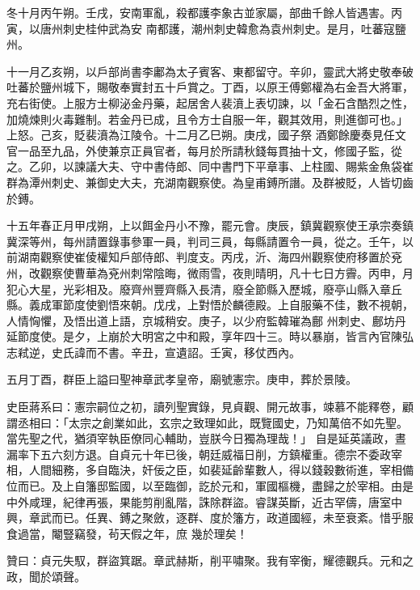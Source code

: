 \begin{pinyinscope}
 冬十月丙午朔。壬戌，安南軍亂，殺都護李象古並家屬，部曲千餘人皆遇害。丙寅，以唐州刺史桂仲武為安
 南都護，潮州刺史韓愈為袁州刺史。是月，吐蕃寇鹽州。



 十一月乙亥朔，以戶部尚書李鄘為太子賓客、東都留守。辛卯，靈武大將史敬奉破吐蕃於鹽州城下，賜敬奉實封五十戶賞之。丁酉，以原王傅鄭權為右金吾大將軍，充右街使。上服方士柳泌金丹藥，起居舍人裴濆上表切諫，以「金石含酷烈之性，加燒煉則火毒難制。若金丹已成，且令方士自服一年，觀其效用，則進御可也。」上怒。己亥，貶裴濆為江陵令。十二月乙巳朔。庚戌，國子祭
 酒鄭餘慶奏見任文官一品至九品，外使兼京正員官者，每月於所請秋錢每貫抽十文，修國子監，從之。乙卯，以諫議大夫、守中書侍郎、同中書門下平章事、上柱國、賜紫金魚袋崔群為潭州刺史、兼御史大夫，充湖南觀察使。為皇甫鎛所譖。及群被貶，人皆切齒於鎛。



 十五年春正月甲戌朔，上以餌金丹小不豫，罷元會。庚辰，鎮冀觀察使王承宗奏鎮冀深等州，每州請置錄事參軍一員，判司三員，每縣請置令一員，從之。壬午，以
 前湖南觀察使崔倰權知戶部侍郎、判度支。丙戌，沂、海四州觀察使府移置於兗州，改觀察使曹華為兗州刺常陰晦，微雨雪，夜則晴明，凡十七日方霽。丙申，月犯心大星，光彩相及。廢齊州豐齊縣入長清，廢全節縣入歷城，廢亭山縣入章丘縣。義成軍節度使劉悟來朝。戊戌，上對悟於麟德殿。上自服藥不佳，數不視朝，人情恟懼，及悟出道上語，京城稍安。庚子，以少府監韓璀為鄜
 州刺史、鄜坊丹延節度使。是夕，上崩於大明宮之中和殿，享年四十三。時以暴崩，皆言內官陳弘志弒逆，史氏諱而不書。辛丑，宣遺詔。壬寅，移仗西內。



 五月丁酉，群臣上謚曰聖神章武孝皇帝，廟號憲宗。庚申，葬於景陵。



 史臣蔣系曰：憲宗嗣位之初，讀列聖實錄，見貞觀、開元故事，竦慕不能釋卷，顧謂丞相曰：「太宗之創業如此，玄宗之致理如此，既覽國史，乃知萬倍不如先聖。當先聖之代，猶須宰執臣僚同心輔助，豈朕今日獨為理哉！」
 自是延英議政，晝漏率下五六刻方退。自貞元十年已後，朝廷威福日削，方鎮權重。德宗不委政宰相，人間細務，多自臨決，奸佞之臣，如裴延齡輩數人，得以錢穀數術進，宰相備位而已。及上自籓邸監國，以至臨御，訖於元和，軍國樞機，盡歸之於宰相。由是中外咸理，紀律再張，果能剪削亂階，誅除群盜。睿謀英斷，近古罕儔，唐室中興，章武而已。任異、鎛之聚斂，逐群、度於籓方，政道國經，未至衰紊。惜乎服食過當，閹豎竊發，茍天假之年，庶
 幾於理矣！



 贊曰：貞元失馭，群盜箕踞。章武赫斯，削平嘯聚。我有宰衡，耀德觀兵。元和之政，聞於頌聲。



\end{pinyinscope}